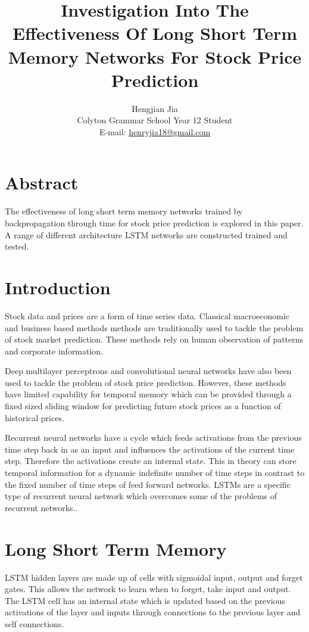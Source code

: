 \documentclass[11pt]{article}
\title{\textbf{Investigation Into The Effectiveness Of Long Short Term Memory Networks For Stock Price Prediction}}
\author{Hengjian Jia \\ Colyton Grammar School Year 12 Student \\ E-mail: \href{mailto:henryjia18@gmail.com}{henryjia18@gmail.com}}
\date{}
\begin{document}
\maketitle

\section{Abstract}

The effectiveness of long short term memory networks trained by backpropagation through time for stock price prediction is explored in this paper. A range of different architecture LSTM networks are constructed trained and tested.

\section{Introduction}

Stock data and prices are a form of time series data. Classical macroeconomic and business based methods methods are traditionally used to tackle the problem of stock market prediction. These methods rely on human observation of patterns and corporate information\cite{TA1}.

Deep multilayer perceptrons \cite{MLP1} and convolutional neural networks \cite{CNN1} have also been used to tackle the problem of stock price prediction. However, these methods have limited capability for temporal memory which can be provided through a fixed sized sliding window for predicting future stock prices as a function of historical prices.

Recurrent neural networks have a cycle which feeds activations from the previous time step back in as an input and influences the activations of the current time step. Therefore the activations create an internal state. This in theory can store temporal information for a dynamic indefinite number of time steps in contrast to the fixed number of time steps of feed forward networks. LSTMs are a specific type of recurrent neural network which overcomes some of the problems of recurrent networks.\cite{LSTM2}.

\section{Long Short Term Memory}

LSTM hidden layers are made up of cells with sigmoidal input, output and forget gates. This allows the network to learn when to forget, take input and output. The LSTM cell has an internal state which is updated based on the previous activations of the layer and inputs through connections to the previous layer and self connections\cite{LSTM1}.
\end{document}
